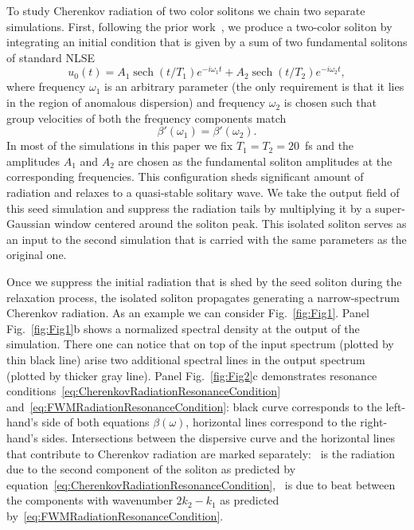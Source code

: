 \documentclass[aps, prl, twocolumn, superscriptaddress, final]{revtex4}
\DeclareMathOperator{\sech}{sech}
\newcommand*\circled[1]{
  \tikz[baseline=(char.base)]{
    \node[shape=circle,draw,inner sep=0.5pt] (char) {#1};
  }
}
\begin{document}
To study Cherenkov radiation of two color solitons we chain two separate simulations. First, following the prior work~\cite{melchert2019soliton}, we produce a two-color soliton by integrating an initial condition that is given by a sum of two fundamental solitons of standard NLSE
\begin{equation}
  \label{eq:SeedInitialCondition}
  u_{0}(t) =
      A_{1} \sech(t / T_{1}) e^{-i \omega_{1} t} +
      A_{2} \sech(t / T_{2}) e^{-i \omega_{2} t},
\end{equation}
where frequency $\omega_{1}$ is an arbitrary parameter (the only requirement is that it lies in the region of anomalous dispersion) and frequency $\omega_{2}$ is chosen such that group velocities of both the frequency components match
\begin{equation*}
  \beta'(\omega_{1}) = \beta'(\omega_{2}).
\end{equation*}
In most of the simulations in this paper we fix $T_{1} = T_{2} = 20$~fs and the amplitudes $A_{1}$ and $A_{2}$ are chosen as the fundamental soliton amplitudes at the corresponding frequencies. This configuration sheds significant amount of radiation and relaxes to a quasi-stable solitary wave. We take the output field of this seed simulation and suppress the radiation tails by multiplying it by a super-Gaussian window centered around the soliton peak. This isolated soliton serves as an input to the second simulation that is carried with the same parameters as the original one.

Once we suppress the initial radiation that is shed by the seed soliton during the relaxation process, the isolated soliton propagates generating a narrow-spectrum Cherenkov radiation. As an example we can consider Fig.~\ref{fig:Fig1}. Panel Fig.~\ref{fig:Fig1}b shows a normalized spectral density at the output of the simulation. There one can notice that on top of the input spectrum (plotted by thin black line) arise two additional spectral lines in the output spectrum (plotted by thicker gray line). Panel Fig.~\ref{fig:Fig2}c demonstrates resonance conditions~\eqref{eq:CherenkovRadiationResonanceCondition} and~\eqref{eq:FWMRadiationResonanceCondition}: black curve corresponds to the left-hand's side of both equations $\beta(\omega)$, horizontal lines correspond to the right-hand's sides. Intersections between the dispersive curve and the horizontal lines that contribute to Cherenkov radiation are marked separately: \circled{1}~is the radiation due to the second component of the soliton as predicted by equation~\eqref{eq:CherenkovRadiationResonanceCondition}, \circled{2}~is due to beat between the components with wavenumber $2 k_{2} - k_{1}$ as predicted by~\eqref{eq:FWMRadiationResonanceCondition}.
\end{document}
